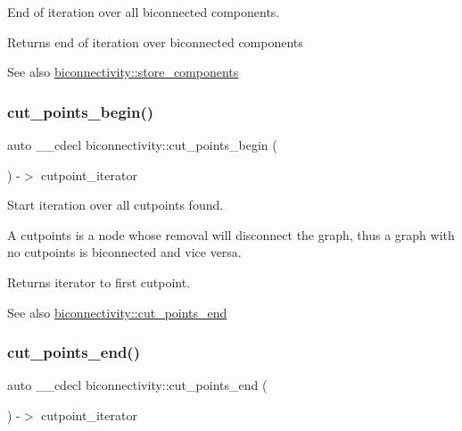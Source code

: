 End of iteration over all biconnected components. 

\begin{DoxyReturn}{Returns}
end of iteration over biconnected components 
\end{DoxyReturn}
\begin{DoxySeeAlso}{See also}
\mbox{\hyperlink{classbiconnectivity_a40e723d97cd42613470ab38baed18c78}{biconnectivity\+::store\+\_\+components}} 
\end{DoxySeeAlso}
\mbox{\label{classbiconnectivity_ac1509d3ad82cdac1b55f50f051e39dde}} 
\subsubsection{\texorpdfstring{cut\+\_\+points\+\_\+begin()}{cut\_points\_begin()}}
{\footnotesize\ttfamily auto \+\_\+\+\_\+cdecl biconnectivity\+::cut\+\_\+points\+\_\+begin (\begin{DoxyParamCaption}{ }\end{DoxyParamCaption}) -\/$>$ cutpoint\+\_\+iterator
	\hspace{0.3cm}{\ttfamily [inline]}}



Start iteration over all cutpoints found. 

A cutpoints is a node whose removal will disconnect the graph, thus a graph with no cutpoints is biconnected and vice versa.

\begin{DoxyReturn}{Returns}
iterator to first cutpoint. 
\end{DoxyReturn}
\begin{DoxySeeAlso}{See also}
\mbox{\hyperlink{classbiconnectivity_abd704c5c467bd63ae3d16ea8bd2af7b5}{biconnectivity\+::cut\+\_\+points\+\_\+end}} 
\end{DoxySeeAlso}
\mbox{\label{classbiconnectivity_abd704c5c467bd63ae3d16ea8bd2af7b5}} 
\subsubsection{\texorpdfstring{cut\+\_\+points\+\_\+end()}{cut\_points\_end()}}
{\footnotesize\ttfamily auto \+\_\+\+\_\+cdecl biconnectivity\+::cut\+\_\+points\+\_\+end (\begin{DoxyParamCaption}{ }\end{DoxyParamCaption}) -\/$>$ cutpoint\+\_\+iterator
	\hspace{0.3cm}{\ttfamily [inline]}}




